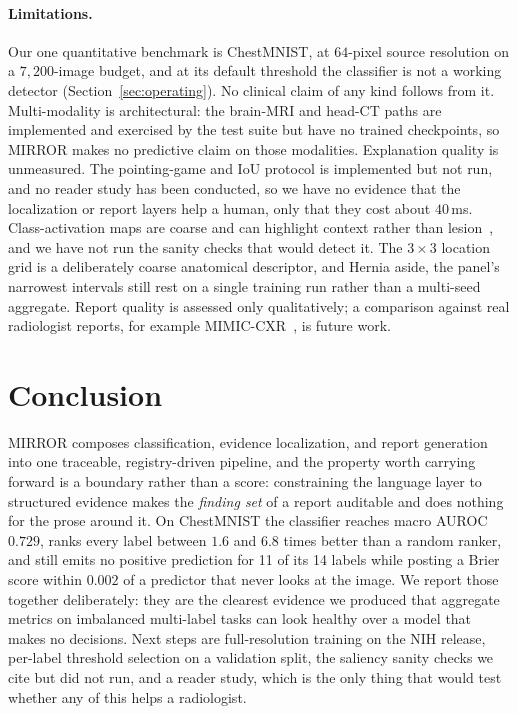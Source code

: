 \documentclass[10pt,twocolumn]{article}
\begin{document}
\paragraph{Limitations.} Our one quantitative benchmark is ChestMNIST, at $64$-pixel
source resolution on a $7{,}200$-image budget, and at its default threshold the
classifier is not a working detector (Section~\ref{sec:operating}). No clinical
claim of any kind follows from it. Multi-modality is architectural: the brain-MRI
and head-CT paths are implemented and exercised by the test suite but have no
trained checkpoints, so MIRROR makes no predictive claim on those modalities.
Explanation quality is unmeasured. The pointing-game and IoU protocol is
implemented but not run, and no reader study has been conducted, so we have no
evidence that the localization or report layers help a human, only that they cost
about $40$\,ms. Class-activation maps are coarse and can highlight context rather
than lesion~\cite{adebayo2018sanity}, and we have not run the sanity checks that
would detect it. The $3\times3$ location grid is a deliberately coarse anatomical
descriptor, and Hernia aside, the panel's narrowest intervals still rest on a
single training run rather than a multi-seed aggregate. Report quality is assessed
only qualitatively; a comparison against real radiologist reports, for example
MIMIC-CXR~\cite{johnson2019mimiccxr}, is future work.

\section{Conclusion}

MIRROR composes classification, evidence localization, and report generation into
one traceable, registry-driven pipeline, and the property worth carrying forward
is a boundary rather than a score: constraining the language layer to structured
evidence makes the \emph{finding set} of a report auditable and does nothing for
the prose around it. On ChestMNIST the classifier reaches macro AUROC $0.729$,
ranks every label between $1.6$ and $6.8$ times better than a random ranker, and
still emits no positive prediction for 11 of its 14 labels while posting a Brier
score within $0.002$ of a predictor that never looks at the image. We report those
together deliberately: they are the clearest evidence we produced that aggregate
metrics on imbalanced multi-label tasks can look healthy over a model that makes
no decisions. Next steps are full-resolution training on the NIH release,
per-label threshold selection on a validation split, the saliency sanity checks we
cite but did not run, and a reader study, which is the only thing that would test
whether any of this helps a radiologist.
\end{document}
